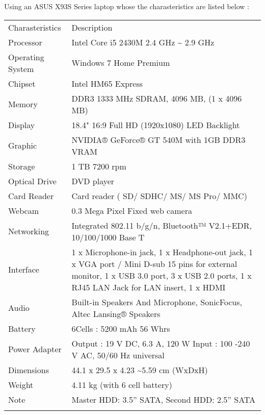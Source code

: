 \documentclass[]{article}
\begin{document}


Using an ASUS X93S Series laptop whose the charasteristics are listed
below :

\begin{longtable}[c]{@{}ll@{}}
\toprule\addlinespace
Charasteristics & Description
\\\addlinespace
\midrule\endhead
Processor & Intel Core i5 2430M 2.4 GHz \textasciitilde{} 2.9 GHz
\\\addlinespace
Operating System & Windows 7 Home Premium
\\\addlinespace
Chipset & Intel HM65 Express
\\\addlinespace
Memory & DDR3 1333 MHz SDRAM, 4096 MB, (1 x 4096 MB)
\\\addlinespace
Display & 18.4" 16:9 Full HD (1920x1080) LED Backlight
\\\addlinespace
Graphic & NVIDIA® GeForce® GT 540M with 1GB DDR3 VRAM
\\\addlinespace
Storage & 1 TB 7200 rpm
\\\addlinespace
Optical Drive & DVD player
\\\addlinespace
Card Reader & Card reader ( SD/ SDHC/ MS/ MS Pro/ MMC)
\\\addlinespace
Webcam & 0.3 Mega Pixel Fixed web camera
\\\addlinespace
Networking & Integrated 802.11 b/g/n, Bluetooth™ V2.1+EDR, 10/100/1000
Base T
\\\addlinespace
Interface & 1 x Microphone-in jack, 1 x Headphone-out jack, 1 x VGA port
/ Mini D-sub 15 pins for external monitor, 1 x USB 3.0 port, 3 x USB 2.0
ports, 1 x RJ45 LAN Jack for LAN insert, 1 x HDMI
\\\addlinespace
Audio & Built-in Speakers And Microphone, SonicFocus, Altec Lansing®
Speakers
\\\addlinespace
Battery & 6Cells : 5200 mAh 56 Whrs
\\\addlinespace
Power Adapter & Output : 19 V DC, 6.3 A, 120 W Input : 100 -240 V AC,
50/60 Hz universal
\\\addlinespace
Dimensions & 44.1 x 29.5 x 4.23 \textasciitilde{}5.59 cm (WxDxH)
\\\addlinespace
Weight & 4.11 kg (with 6 cell battery)
\\\addlinespace
Note & Master HDD: 3.5'' SATA, Second HDD: 2.5'' SATA
\\\addlinespace
\bottomrule
\end{longtable}
\end{document}
